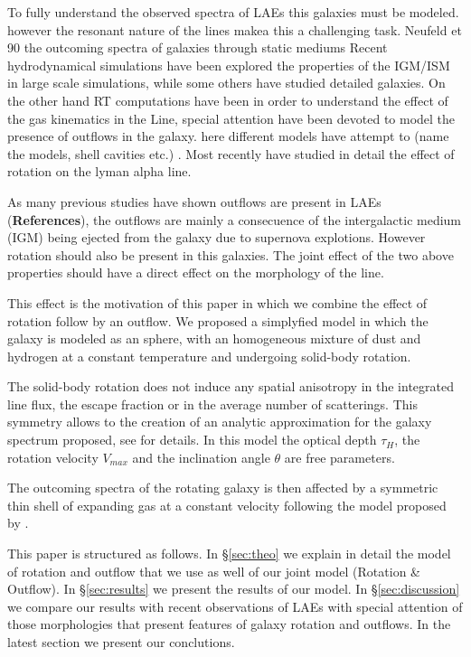 \documentclass{latex/emulateapj}
\begin{document}
To fully understand the observed spectra of LAEs this galaxies must be modeled.
however the resonant nature of the lines makea this a challenging task. 
Neufeld et 90 the outcoming spectra of galaxies through static mediums 
Recent hydrodynamical simulations have been explored the properties of the IGM/ISM 
in large scale simulations, while some others have studied detailed galaxies. 
On the other hand RT computations have been in order to understand the effect of the 
gas kinematics in the Line, special attention have been devoted to model the presence 
of outflows in the galaxy. here different models have attempt to (name the models, shell cavities etc.)
. Most recently \cite{Garavito14} have studied in detail the effect 
of rotation on the lyman alpha line.

As many previous studies have shown outflows are present in LAEs (\textbf{References}),
the outflows are mainly a consecuence of the intergalactic medium (IGM) being ejected 
from the galaxy due to supernova explotions.
However rotation should also be present in this galaxies. The joint effect of the two 
above properties should have a direct effect on the morphology of the \lya line.

This effect is the motivation of this paper in which we combine the effect of rotation 
follow by an outflow. We proposed a simplyfied model in which the galaxy is modeled
as an sphere, with an homogeneous mixture of dust and hydrogen at a constant temperature
and undergoing solid-body rotation.  

The solid-body rotation does not induce any spatial anisotropy in the integrated line flux, 
the escape fraction or in the average number of scatterings. This symmetry allows 
to the creation of an analytic approximation for the galaxy spectrum 
proposed, see \cite{Garavito14} for details. In this model the optical depth $\tau_{H}$, the 
rotation velocity $V_{max}$ and the inclination angle $\theta$ are free parameters.
 
The outcoming spectra of the rotating galaxy is then affected by a symmetric thin shell of expanding
gas at a constant velocity following the model proposed by \cite{2014arXiv1404.2958V, Orsi12}.  

This paper is structured as follows. In \S \ref{sec:theo} we explain in detail the model of rotation
and outflow that we use as well of our joint model (Rotation \& Outflow). In \S \ref{sec:results} we present
the results of our model. In \S \ref{sec:discussion} we compare our results with 
recent observations of LAEs with special attention of those morphologies that present
features of galaxy rotation and outflows. In the latest section we present our 
conclutions.
\end{document}
